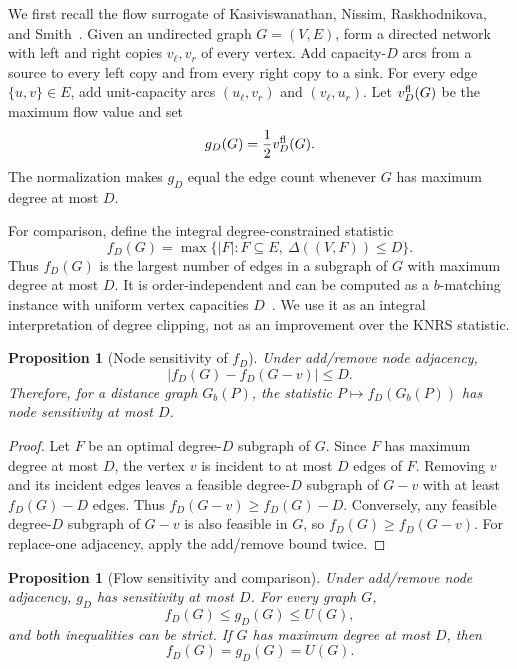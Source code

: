 \documentclass[11pt]{article}
\newtheorem{proposition}[theorem]{Proposition}
\begin{document}
We first recall the flow surrogate of Kasiviswanathan, Nissim, Raskhodnikova, and Smith~\cite{KNRS13}. Given an undirected graph \(G=(V,E)\), form a directed network with left and right copies \(v_\ell,v_r\) of every vertex. Add capacity-\(D\) arcs from a source to every left copy and from every right copy to a sink. For every edge \(\{u,v\}\in E\), add unit-capacity arcs \((u_\ell,v_r)\) and \((v_\ell,u_r)\). Let \(v_D^{\rm fl}(G)\) be the maximum flow value and set
\[
g_D(G)=\frac12 v_D^{\rm fl}(G).
\]
The normalization makes \(g_D\) equal the edge count whenever \(G\) has maximum degree at most \(D\).

For comparison, define the integral degree-constrained statistic
\[
f_D(G)=\max\bigl\{|F|:F\subseteq E,\ \Delta((V,F))\le D\bigr\}.
\]
Thus \(f_D(G)\) is the largest number of edges in a subgraph of \(G\) with maximum degree at most \(D\). It is order-independent and can be computed as a \(b\)-matching instance with uniform vertex capacities \(D\)~\cite{Schrijver03,Gabow18}. We use it as an integral interpretation of degree clipping, not as an improvement over the KNRS statistic.

\begin{proposition}[Node sensitivity of \(f_D\)]
\label{prop:sensitivity}
Under add/remove node adjacency,
\[
|f_D(G)-f_D(G-v)|\le D.
\]
Therefore, for a distance graph \(G_b(P)\), the statistic \(P\mapsto f_D(G_b(P))\) has node sensitivity at most \(D\).
\end{proposition}

\begin{proof}
Let \(F\) be an optimal degree-\(D\) subgraph of \(G\). Since \(F\) has maximum degree at most \(D\), the vertex \(v\) is incident to at most \(D\) edges of \(F\). Removing \(v\) and its incident edges leaves a feasible degree-\(D\) subgraph of \(G-v\) with at least \(f_D(G)-D\) edges. Thus \(f_D(G-v)\ge f_D(G)-D\). Conversely, any feasible degree-\(D\) subgraph of \(G-v\) is also feasible in \(G\), so \(f_D(G)\ge f_D(G-v)\). For replace-one adjacency, apply the add/remove bound twice.
\end{proof}

\begin{proposition}[Flow sensitivity and comparison]
\label{prop:flow-comparison}
Under add/remove node adjacency, \(g_D\) has sensitivity at most \(D\). For every graph \(G\),
\[
f_D(G)\le g_D(G)\le U(G),
\]
and both inequalities can be strict. If \(G\) has maximum degree at most \(D\), then
\[
f_D(G)=g_D(G)=U(G).
\]
\end{proposition}
\end{document}
